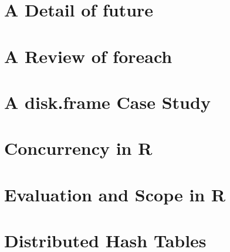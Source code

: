 \section{A Detail of future}\label{sec:future-detail}

\section{A Review of foreach}\label{sec:review-foreach}

\section{A disk.frame Case Study}\label{sec:disk-frame-study}

\section{Concurrency in R}\label{sec:concurrency-r}

\section{Evaluation and Scope in R}\label{sec:eval-r}

\section{Distributed Hash Tables}\label{sec:dht}

